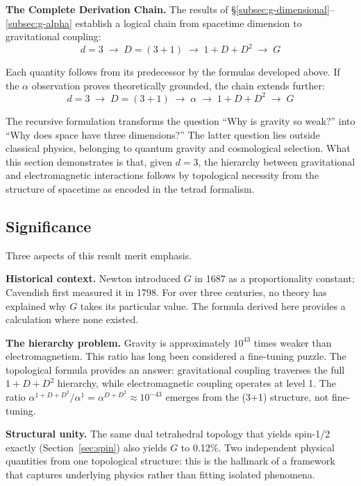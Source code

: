 \documentclass[aps,prd,preprint,superscriptaddress,showpacs,preprintnumbers,amsmath,amssymb,nofootinbib]{revtex4-2}
\begin{document}
\textbf{The Complete Derivation Chain.} The results of \S\ref{subsec:g-dimensional}--\ref{subsec:g-alpha} establish a logical chain from spacetime dimension to gravitational coupling:
\begin{equation}
d = 3 \;\longrightarrow\; D = (3+1) \;\longrightarrow\; 1 + D + D^2 \;\longrightarrow\; G
\end{equation}

Each quantity follows from its predecessor by the formulas developed above. If the $\alpha$ observation proves theoretically grounded, the chain extends further:
\begin{equation}
d = 3 \;\longrightarrow\; D = (3+1) \;\longrightarrow\; \alpha \;\longrightarrow\; 1 + D + D^2 \;\longrightarrow\; G
\end{equation}

The recursive formulation transforms the question ``Why is gravity so weak?'' into ``Why does space have three dimensions?'' The latter question lies outside classical physics, belonging to quantum gravity and cosmological selection. What this section demonstrates is that, given $d = 3$, the hierarchy between gravitational and electromagnetic interactions follows by topological necessity from the structure of spacetime as encoded in the tetrad formalism.

\subsection{Significance}
\label{subsec:g-significance}

Three aspects of this result merit emphasis.

\textbf{Historical context.} Newton introduced $G$ in 1687 as a proportionality constant; Cavendish first measured it in 1798. For over three centuries, no theory has explained why $G$ takes its particular value. The formula derived here provides a calculation where none existed.

\textbf{The hierarchy problem.} Gravity is approximately $10^{43}$ times weaker than electromagnetism. This ratio has long been considered a fine-tuning puzzle. The topological formula provides an answer: gravitational coupling traverses the full $1 + D + D^2$ hierarchy, while electromagnetic coupling operates at level 1. The ratio $\alpha^{1+D+D^2}/\alpha^1 = \alpha^{D+D^2} \approx 10^{-43}$ emerges from the (3+1) structure, not fine-tuning.

\textbf{Structural unity.} The same dual tetrahedral topology that yields spin-1/2 exactly (Section~\ref{sec:spin}) also yields $G$ to 0.12\%. Two independent physical quantities from one topological structure: this is the hallmark of a framework that captures underlying physics rather than fitting isolated phenomena.
\end{document}
